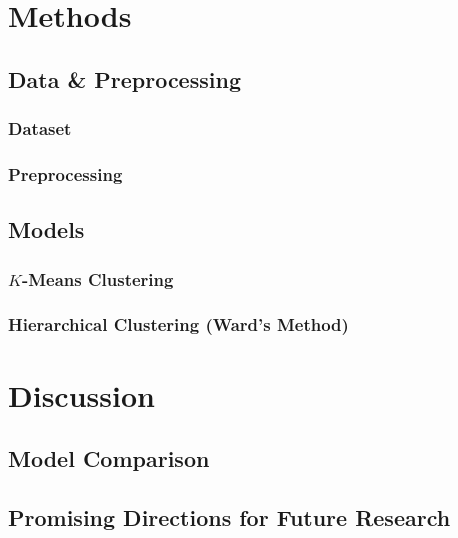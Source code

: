 \documentclass[letterpaper]{article}
\theoremstyle{definition}
\begin{document}
\section{Methods}\label{sec:methods}
\subsection{Data \& Preprocessing}\label{subsec:data}
\subsubsection{Dataset}
\subsubsection{Preprocessing}
\subsection{Models}
\subsubsection{$K$-Means Clustering}
\subsubsection{Hierarchical Clustering (Ward's Method)}
\section{Discussion}\label{sec:discussion}
\subsection{Model Comparison}\label{subsec:comparison}
\subsection{Promising Directions for Future Research}\label{subsec:future}

\newpage


\end{document}
